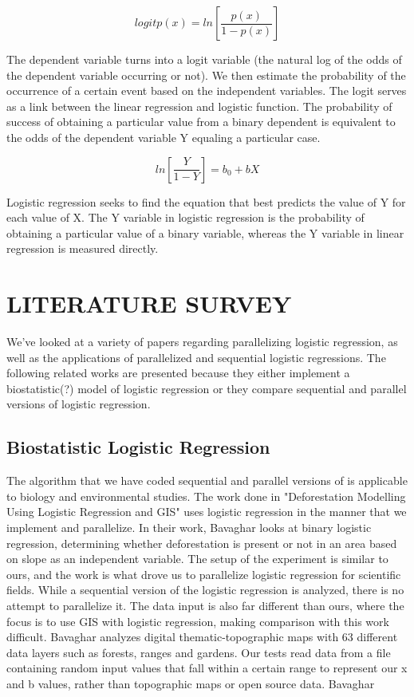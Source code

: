 \documentclass[letterpaper, 10 pt, conference]{ieeeconf}  %
\begin{document}
$$logit p(x) = ln[\frac{p(x)}{1-p(x)}]$$

The dependent variable turns into a logit variable (the natural log of the odds of the dependent variable occurring or not). We then estimate the probability of the occurrence of a certain event based on the independent variables. The logit serves as a link between the linear regression and logistic function. The probability of success of obtaining a particular value from a binary dependent is equivalent to the odds of the dependent variable Y equaling a particular case.

$$ln[\frac{Y}{1-Y}] = b_0 + bX$$

Logistic regression seeks to find the equation that best predicts the value of Y for each value of X. The Y variable in logistic regression is the probability of obtaining a particular value of a binary variable, whereas the Y variable in linear regression is measured directly.


\section{LITERATURE SURVEY}
We've looked at a variety of papers regarding parallelizing logistic regression, as well as the applications of parallelized and sequential logistic regressions. The following related works are presented because they either implement a biostatistic(?) model of logistic regression or they compare sequential and parallel versions of logistic regression. 

\subsection{Biostatistic Logistic Regression}
The algorithm that we have coded sequential and parallel versions of is applicable to biology and environmental studies. The work done in "Deforestation Modelling Using Logistic Regression and GIS" \cite{c1} uses logistic regression in the manner that we implement and parallelize. In their work,  Bavaghar looks at binary logistic regression, determining whether deforestation is present or not in an area based on slope as an independent variable. The setup of the experiment is similar to ours, and the work is what drove us to parallelize logistic regression for scientific fields. While a sequential version of the logistic regression is analyzed, there is no attempt to parallelize it. The data input is also far different than ours, where the focus is to use GIS with logistic regression, making comparison with this work difficult. Bavaghar analyzes digital thematic-topographic maps with 63 different data layers such as forests, ranges and gardens. Our tests read data from a file containing random input values that fall within a certain range to represent our x and b values, rather than topographic maps or open source data.
Bavaghar
\end{document}
